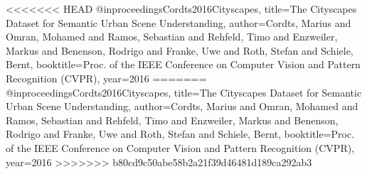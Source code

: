<<<<<<< HEAD
@inproceedings{Cordts2016Cityscapes,
title={The Cityscapes Dataset for Semantic Urban Scene Understanding},
author={Cordts, Marius and Omran, Mohamed and Ramos, Sebastian and Rehfeld, Timo and Enzweiler, Markus and Benenson, Rodrigo and Franke, Uwe and Roth, Stefan and Schiele, Bernt},
booktitle={Proc. of the IEEE Conference on Computer Vision and Pattern Recognition (CVPR)},
year={2016}
}
=======
@inproceedings{Cordts2016Cityscapes,
title={The Cityscapes Dataset for Semantic Urban Scene Understanding},
author={Cordts, Marius and Omran, Mohamed and Ramos, Sebastian and Rehfeld, Timo and Enzweiler, Markus and Benenson, Rodrigo and Franke, Uwe and Roth, Stefan and Schiele, Bernt},
booktitle={Proc. of the IEEE Conference on Computer Vision and Pattern Recognition (CVPR)},
year={2016}
}
>>>>>>> b80cd9c50abe58b2a21f39d46481d189ca292ab3
